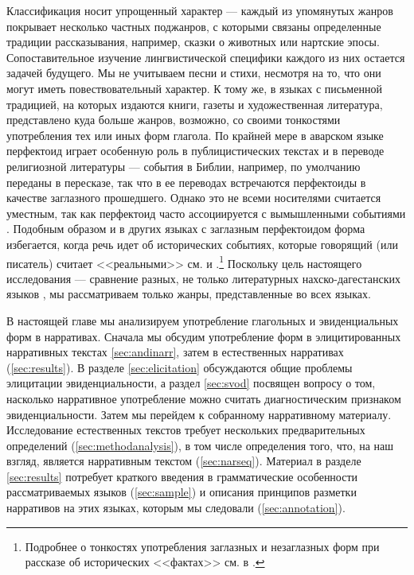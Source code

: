 \par Классификация носит упрощенный характер --- каждый из упомянутых жанров покрывает несколько частных поджанров, с которыми связаны определенные традиции рассказывания, например, сказки о животных или нартские эпосы. Сопоставительное изучение лингвистической специфики каждого из них остается задачей будущего. Мы не учитываем песни и стихи, несмотря на то, что они могут иметь повествовательный характер. К тому же, в языках с письменной традицией, на которых издаются книги, газеты и художественная литература, представлено куда больше жанров, возможно, со своими тонкостями употребления тех или иных форм глагола. По крайней мере в аварском языке перфектоид играет особенную роль в публицистических текстах \citep{forker2018evid} и в переводе религиозной литературы --- события в Библии, например, по умолчанию переданы в пересказе, так что в ее переводах встречаются перфектоиды в качестве заглазного прошедшего. Однако это не всеми носителями считается уместным, так как перфектоид часто ассоциируется с вымышленными событиями \citep{verhees2018}. Подобным образом и в других языках с заглазным перфектоидом форма избегается, когда речь идет об исторических событиях, которые говорящий (или писатель) считает <<реальными>> см. \citep[187]{slobinaksukoc1982} и \citep[42--43]{shinzato1991}.\footnote{Подробнее о тонкостях употребления заглазных и незаглазных форм при рассказе об исторических <<фактах>> см. в  \citep{friedman1986, friedman2014}.} Поскольку цель настоящего исследования — сравнение разных, не только литературных нахско-дагестанских языков , мы рассматриваем только жанры, представленные во всех языках.
\par В настоящей главе мы анализируем употребление глагольных и эвиденциальных форм в нарративах. Сначала мы обсудим употребление форм в элицитированных нарративных текстах \ref{sec:andinarr}, затем в естественных нарративах (\ref{sec:results}). В разделе \ref{sec:elicitation} обсуждаются общие проблемы элицитации эвиденциальности, а раздел \ref{sec:svod} посвящен вопросу о том, насколько нарративное употребление можно считать диагностическим признаком эвиденциальности. Затем мы перейдем к собранному нарративному материалу. Исследование естественных текстов требует нескольких предварительных определений (\ref{sec:methodanalysis}), в том числе определения того, что, на наш взгляд, является нарративным текстом (\ref{sec:narseq}). Материал в разделе \ref{sec:results} потребует краткого введения в грамматические особенности рассматриваемых языков (\ref{sec:sample}) и описания принципов разметки нарративов на этих языках, которым мы следовали (\ref{sec:annotation}).

